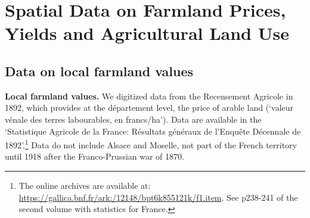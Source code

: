\documentclass[11pt]{report}
\begin{document}
\newpage

\section{Spatial Data on Farmland Prices, Yields and Agricultural Land Use}\label{A-sec:spatialagri}

\subsection{Data on local farmland values}\label{A-sec:PRA}

\noindent \textbf{Local farmland values.} We digitized data from the Recensement Agricole in 1892, which provides at the département level, the price of arable land (`valeur vénale des terres labourables, en francs/ha'). Data are available in the `Statistique Agricole de la France: Résultats généraux de l'Enquête Décennale de 1892'.\footnote{The online archives are available at:  \url{https://gallica.bnf.fr/ark:/12148/bpt6k855121k/f1.item}. See p238-241 of the second volume with statistics for France.} Data do not include Alsace and Moselle, not part of the French territory until 1918 after the Franco-Prussian war of 1870.
\end{document}
